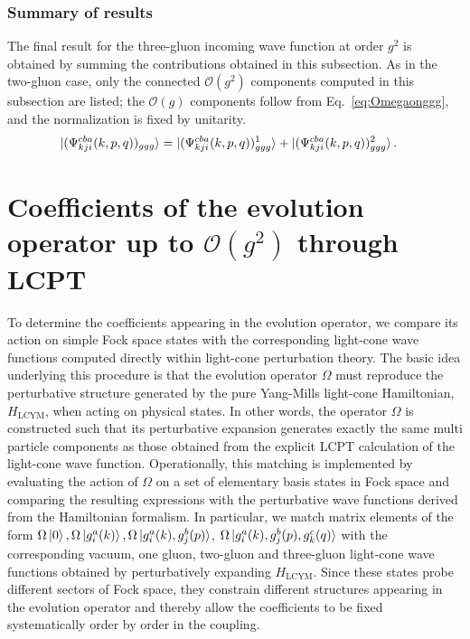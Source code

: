 \documentclass[a4paper,11pt]{article}
\begin{document}
\subsubsection{Summary of results}
The final result for the three-gluon incoming wave function at order $g^{2}$ is obtained by summing the contributions obtained in this subsection. {\color{chg}As in the two-gluon case, only the connected $\mathcal{O}(g^{2})$ components computed in this subsection are listed; the $\mathcal{O}(g)$ components follow from Eq.~\eqref{eq:Omegaonggg}, and the normalization is fixed by unitarity.}
\begin{align}
    \ket{(\Psi^{cba}_{kji}(k,p,q))_{ggg}} & =  \ket{(\Psi^{cba}_{kji}(k,p,q))^{1}_{ggg}} + \ket{(\Psi^{cba}_{kji}(k,p,q))^{2}_{ggg}}.
\end{align}

\section{Coefficients of the evolution operator up to $\mathcal{O}(g^2)$ through LCPT} \label{sec:coeff}
To determine the coefficients appearing in the evolution operator, we compare its action on simple Fock space states with the corresponding light-cone wave functions computed directly within light-cone perturbation theory. The basic idea underlying this procedure is that the evolution operator $\Omega$ must reproduce the perturbative structure generated by the pure Yang-Mills light-cone Hamiltonian, $H_{\text{LCYM}}$, when acting on physical states. In other words, the operator $\Omega$ is constructed such that its perturbative expansion generates exactly the same multi particle components as those obtained from the explicit LCPT calculation of the light-cone wave function. Operationally, this matching is implemented by evaluating the action of $\Omega$ on a set of elementary basis states in Fock space and comparing the resulting expressions with the perturbative wave functions derived from the Hamiltonian formalism. In particular, we match matrix elements of the form $\Omega\ket{0}, \Omega\ket{g^{a}_{i}(k)}, \Omega\ket{g^{a}_{i}(k),g^{b}_{j}(p)}${\color{chg}, $\Omega\ket{g^{a}_{i}(k),g^{b}_{j}(p),g^{c}_{k}(q)}$} with the corresponding vacuum, one gluon{\color{chg}, two-gluon and three-gluon} light-cone wave functions obtained by perturbatively expanding $H_{\text{LCYM}}$. Since these states probe different sectors of Fock space, they constrain different structures appearing in the evolution operator and thereby allow the coefficients to be fixed systematically order by order in the coupling.
\end{document}

